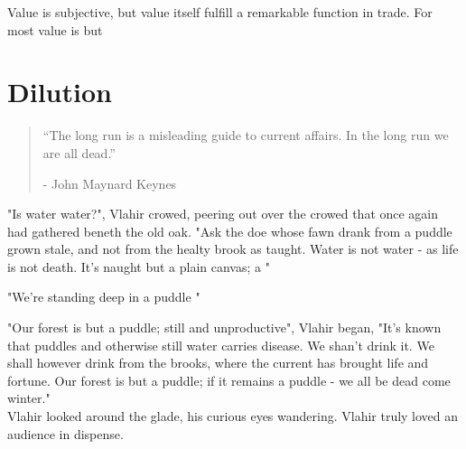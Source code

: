 \documentclass[smalldemyvopaper,11pt,twoside,onecolumn,openright,extrafontsizes]{memoir}
\begin{document}

Value is subjective, but value itself fulfill a remarkable function in trade. For most value is but 

\chapter{Dilution}

\vspace{-1.3cm}
\begin{localsize}{10}
	\begin{quote}
		“The long run is a misleading guide to current affairs. In the long run we are all dead.” 
		\begin{flushright}- John Maynard Keynes \end{flushright}
	\end{quote} 
\end{localsize}
\vspace{1cm}

"Is water water?", Vlahir crowed, peering out over the crowed that once again had gathered beneth the old oak. "Ask the doe whose fawn drank from a puddle grown stale, and not from the healty brook as taught. Water is not water - as life is not death. It's naught but a plain canvas; a " 

"We're standing deep in a puddle "

"Our forest is but a puddle; still and unproductive", Vlahir began, "It's known that puddles and otherwise still water carries disease. We shan't drink it.
We shall however drink from the brooks, where the current has brought life and fortune. Our forest is but a puddle; if it remains a puddle - we all be dead come winter."\\

Vlahir looked around the glade, his curious eyes wandering. Vlahir truly loved an audience in dispense.\\
\end{document}

